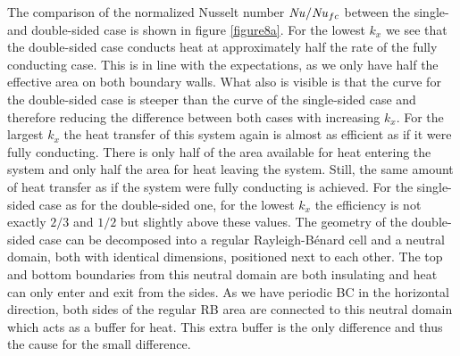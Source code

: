 \documentclass{jfm}
\newcommand\Nus{\mbox{\textit{Nu}}}  %
\begin{document}
The comparison of the normalized Nusselt number $\Nus/\Nus_{fc}$ between the
single- and double-sided case is shown in figure \ref{figure8a}.  For the
lowest $k_x$ we see that the double-sided case conducts heat at approximately
half the rate of the fully conducting case.  This is in line with the
expectations, as we only have half the effective area on both boundary walls.
What also is visible is that the curve for the double-sided case is steeper
than the curve of the single-sided case and therefore reducing the difference
between both cases with increasing $k_x$.  For the largest $k_x$ the heat
transfer of this system again is almost as efficient as if it were fully
conducting.  There is only half of the area available for heat entering the
system and only half the area for heat leaving the system.  Still, the same
amount of heat transfer as if the system were fully conducting is achieved.
For the single-sided case as for the double-sided one, for the lowest $k_x$
the efficiency is not exactly $2/3$ and $1/2$ but slightly above these values.
The geometry of the double-sided case can be decomposed into a regular
Rayleigh-B\'enard cell and a neutral domain, both with identical dimensions,
positioned next to each other.  The top and bottom boundaries from this
neutral domain are both insulating and heat can only enter and exit from the
sides.  As we have periodic BC in the horizontal direction, both sides of the
regular RB area are connected to this neutral domain which acts as a buffer
for heat.  This extra buffer is the only difference and thus the cause for the
small difference.
\end{document}
